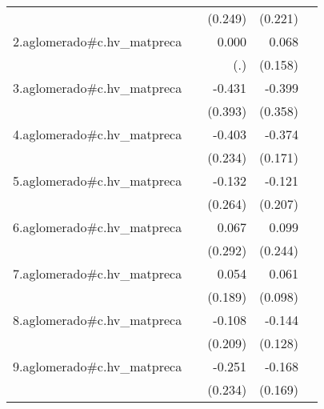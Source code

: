 {\begin{longtable}{l*{4}{D{.}{.}{-1}}}
            &                     &     (0.249)         &     (0.221)         &                     \\
\addlinespace
2.aglomerado#c.hv\_matpreca&                     &       0.000         &       0.068         &                     \\
            &                     &         (.)         &     (0.158)         &                     \\
\addlinespace
3.aglomerado#c.hv\_matpreca&                     &      -0.431         &      -0.399         &                     \\
            &                     &     (0.393)         &     (0.358)         &                     \\
\addlinespace
4.aglomerado#c.hv\_matpreca&                     &      -0.403         &      -0.374\sym{*}  &                     \\
            &                     &     (0.234)         &     (0.171)         &                     \\
\addlinespace
5.aglomerado#c.hv\_matpreca&                     &      -0.132         &      -0.121         &                     \\
            &                     &     (0.264)         &     (0.207)         &                     \\
\addlinespace
6.aglomerado#c.hv\_matpreca&                     &       0.067         &       0.099         &                     \\
            &                     &     (0.292)         &     (0.244)         &                     \\
\addlinespace
7.aglomerado#c.hv\_matpreca&                     &       0.054         &       0.061         &                     \\
            &                     &     (0.189)         &     (0.098)         &                     \\
\addlinespace
8.aglomerado#c.hv\_matpreca&                     &      -0.108         &      -0.144         &                     \\
            &                     &     (0.209)         &     (0.128)         &                     \\
\addlinespace
9.aglomerado#c.hv\_matpreca&                     &      -0.251         &      -0.168         &                     \\
            &                     &     (0.234)         &     (0.169)         &                     \\

\end{longtable}}
